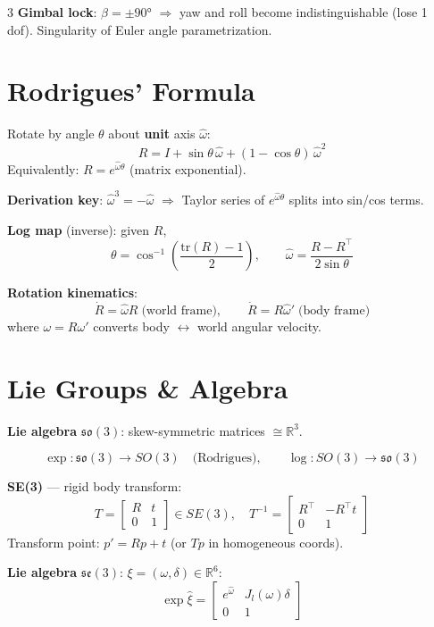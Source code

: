\documentclass[9pt,landscape]{article}
\begin{document}
\begin{multicols}{3}
\textbf{Gimbal lock}: $\beta=\pm90°$ $\Rightarrow$ yaw and roll become indistinguishable (lose 1 dof). Singularity of Euler angle parametrization.

\section{Rodrigues' Formula}

Rotate by angle $\theta$ about \textbf{unit} axis $\hat\omega$:
\[\boxed{R=I+\sin\theta\,\hat\omega+(1-\cos\theta)\,\hat\omega^2}\]
Equivalently: $R=e^{\hat\omega\theta}$ (matrix exponential).

\textbf{Derivation key}: $\hat\omega^3=-\hat\omega$ $\Rightarrow$ Taylor series of $e^{\hat\omega\theta}$ splits into sin/cos terms.

\textbf{Log map} (inverse): given $R$,
\[\theta=\cos^{-1}\!\left(\frac{\mathrm{tr}(R)-1}{2}\right),\qquad \hat\omega=\frac{R-R^\top}{2\sin\theta}\]

\textbf{Rotation kinematics}:
\[\dot R=\hat\omega R\;\text{(world frame)},\qquad \dot R=R\hat\omega'\;\text{(body frame)}\]
where $\omega=R\omega'$ converts body $\leftrightarrow$ world angular velocity.

\section{Lie Groups \& Algebra}

\textbf{Lie algebra} $\mathfrak{so}(3)$: skew-symmetric matrices $\cong\mathbb{R}^3$.

\[\exp:\mathfrak{so}(3)\to SO(3)\quad\text{(Rodrigues)},\qquad\log:SO(3)\to\mathfrak{so}(3)\]

\textbf{SE(3)} — rigid body transform:
\[T=\begin{bmatrix}R&t\\0&1\end{bmatrix}\in SE(3),\quad T^{-1}=\begin{bmatrix}R^\top&-R^\top t\\0&1\end{bmatrix}\]
Transform point: $p'=Rp+t$ (or $Tp$ in homogeneous coords).

\textbf{Lie algebra} $\mathfrak{se}(3)$: $\xi=(\omega,\delta)\in\mathbb{R}^6$:
\[\exp\hat\xi=\begin{bmatrix}e^{\hat\omega}&J_l(\omega)\delta\\0&1\end{bmatrix}\]


\end{multicols}
\end{document}
